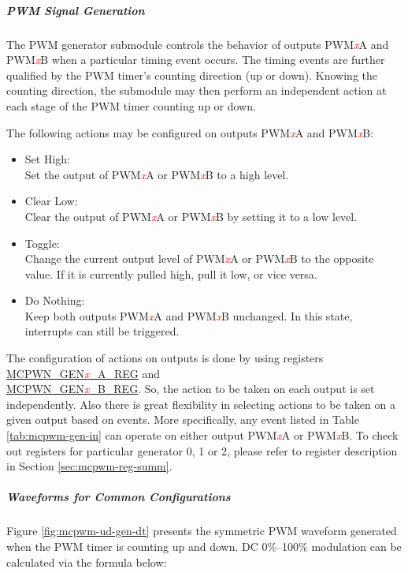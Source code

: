 \documentclass[main\_\_EN.tex]{subfiles}
\begin{document}
\subparagraph{PWM Signal Generation}
The PWM generator submodule controls the behavior of outputs PWM\textcolor{red}{\it{x}}A and PWM\textcolor{red}{\it{x}}B when a particular timing event occurs. The timing events are further qualified by the PWM timer's counting direction (up or down). Knowing the counting direction, the submodule may then perform an independent action at each stage of the PWM timer counting up or down.

The following actions may be configured on outputs PWM\textcolor{red}{\it{x}}A and PWM\textcolor{red}{\it{x}}B:
\begin{itemize}
    \item Set High:\\
    Set the output of PWM\textcolor{red}{\it{x}}A or PWM\textcolor{red}{\it{x}}B to a high level.
    \item Clear Low:\\
    Clear the output of PWM\textcolor{red}{\it{x}}A or PWM\textcolor{red}{\it{x}}B by setting it to a low level.
    \item Toggle:\\
    Change the current output level of PWM\textcolor{red}{\it{x}}A or PWM\textcolor{red}{\it{x}}B to the opposite value. If it is currently pulled high, pull it low, or vice versa.
    \item Do Nothing:\\
    Keep both outputs PWM\textcolor{red}{\it{x}}A and PWM\textcolor{red}{\it{x}}B unchanged. In this state, interrupts can still be triggered.
\end{itemize}

The configuration of actions on outputs is done by using registers \hyperref[regdesc:MCPWMGEN0AREG]{MCPWN\_GEN\textcolor{red}{\it{x}}\_A\_REG} and \\\hyperref[regdesc:MCPWMGEN0BREG]{MCPWN\_GEN\textcolor{red}{\it{x}}\_B\_REG}. So, the action to be taken on each output is set independently. Also there is great flexibility in selecting actions to be taken on a given output based on events. More specifically, any event listed in Table \ref{tab:mcpwm-gen-in} can operate on either output PWM\textcolor{red}{\it{x}}A or PWM\textcolor{red}{\it{x}}B. To check out registers for particular generator 0, 1 or 2, please refer to register description in Section \ref{sec:mcpwm-reg-summ}.

\subparagraph{Waveforms for Common Configurations}
Figure \ref{fig:mcpwm-ud-gen-dt} presents the symmetric PWM waveform generated when the PWM timer is counting up and down. DC 0\%–100\% modulation can be calculated via the formula below:
\end{document}
